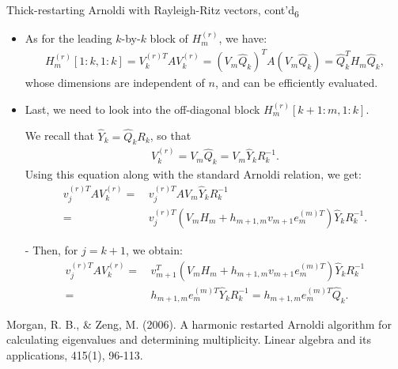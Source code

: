 \documentclass[t,usepdftitle=false]{beamer}
\begin{document}
\begin{frame}{Thick-restarting Arnoldi with Rayleigh-Ritz vectors, cont'd\textsubscript{6}}
\begin{itemize}
\item As for the leading $k$-by-$k$ block of $H_m^{(r)}$, we have:
\begin{align*}
H_m^{(r)}[1\!:\!k,1\!:\!k]
=
V_k^{(r)T}AV_k^{(r)}
=
(V_m\hat{Q}_k)^TA(V_m\hat{Q}_k)
=
\hat{Q}_k^TH_m\hat{Q}_k,
\end{align*}
whose dimensions are independent of $n$, and can be efficiently evaluated.
\item Last, we need to look into the off-diagonal block $H_m^{(r)}[k+1\!:\!m,1\!:\!k]$.
\item[] We recall that $\hat{Y}_k=\hat{Q}_kR_k$, so that
\begin{align*}
V_k^{(r)}=V_m\hat{Q}_k=V_m\hat{Y}_kR_k^{-1}.
\end{align*}
Using this equation along with the standard Arnoldi relation, we get:
\begin{align*}
v_j^{(r)T}AV_k^{(r)}
=&\,v_j^{(r)T}AV_m\hat{Y}_kR_k^{-1}\\
=&\,v_j^{(r)T}(V_mH_m+h_{m+1,m}v_{m+1}e_m^{(m)T})\hat{Y}_kR_k^{-1}.
\end{align*}
\item[-] Then, for $j=k+1$, we obtain:\vspace{-.07cm}
\begin{align*}
v_j^{(r)T}AV_k^{(r)}
=&\,v_{m+1}^T(V_mH_m+h_{m+1,m}v_{m+1}e_m^{(m)T})\hat{Y}_kR_k^{-1}\\
=&\,h_{m+1,m}e_m^{(m)T}\hat{Y}_kR_k^{-1}
=h_{m+1,m}e_m^{(m)T}\hat{Q}_k.
\end{align*}
\end{itemize}
\tiny{Morgan, R. B., \& Zeng, M. (2006). A harmonic restarted Arnoldi algorithm for calculating eigenvalues and determining
multiplicity. Linear algebra and its applications, 415(1), 96-113.}
\end{frame}
\end{document}
